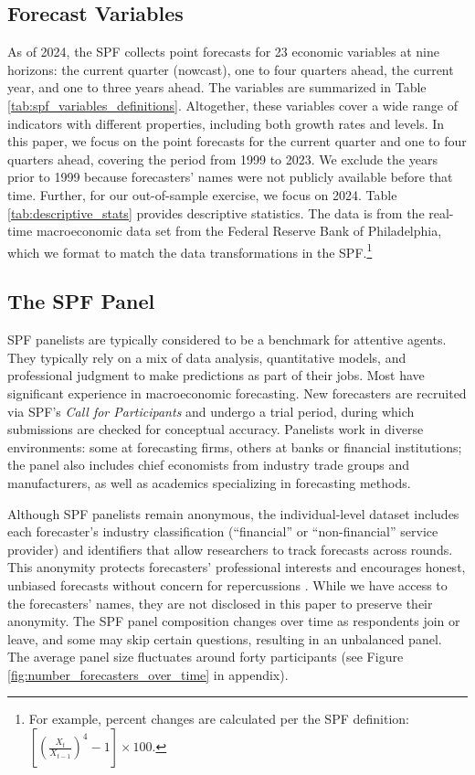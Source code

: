 \documentclass[11pt,letterpaper]{scrartcl}
\begin{document}
\subsection{Forecast Variables}
As of 2024, the SPF collects point forecasts for 23 economic variables at nine horizons: the current quarter (nowcast), one to four quarters ahead, the current year, and one to three years ahead. The variables are summarized in Table \ref{tab:spf_variables_definitions}. Altogether, these variables cover a wide range of indicators with different properties, including both growth rates and levels. In this paper, we focus on the point forecasts for the current quarter and one to four quarters ahead, covering the period from 1999 to 2023. We exclude the years prior to 1999 because forecasters' names were not publicly available before that time. Further, for our out-of-sample exercise, we focus on 2024. Table \ref{tab:descriptive_stats} provides descriptive statistics. The data is from the real-time macroeconomic data set from the Federal Reserve Bank of Philadelphia, which we format to match the data transformations in the SPF.\footnote{For example, percent changes are calculated per the SPF definition: $\left[\left( \frac{X_t}{X_{t-1}} \right)^4  - 1 \right] \times 100$.} 

\subsection{The SPF Panel}

SPF panelists are typically considered to be a benchmark for attentive agents. They typically rely on a mix of data analysis, quantitative models, and professional judgment to make predictions as part of their jobs. Most have significant experience in macroeconomic forecasting. New forecasters are recruited via SPF's \emph{Call for Participants} and undergo a trial period, during which submissions are checked for conceptual accuracy. Panelists work in diverse environments: some at forecasting firms, others at banks or financial institutions; the panel also includes chief economists from industry trade groups and manufacturers, as well as academics specializing in forecasting methods.

Although SPF panelists remain anonymous, the individual-level dataset includes each forecaster's industry classification (``financial'' or ``non-financial'' service provider) and identifiers that allow researchers to track forecasts across rounds. This anonymity protects forecasters' professional interests and encourages honest, unbiased forecasts without concern for repercussions \citep{croushore2019fifty}. While we have access to the forecasters' names, they are not disclosed in this paper to preserve their anonymity. The SPF panel composition changes over time as respondents join or leave, and some may skip certain questions, resulting in an unbalanced panel. The average panel size fluctuates around forty participants (see Figure \ref{fig:number_forecasters_over_time} in appendix).
\end{document}
